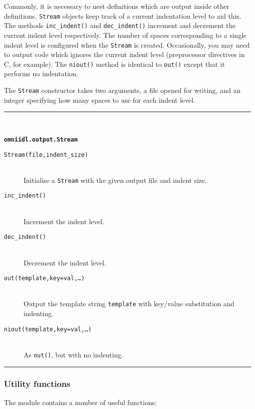 \documentclass[11pt,twoside,a4paper]{article}
\newcommand{\func}[1]{\texttt{#1}}
\newcommand{\var}[1]{\texttt{#1}}
\newcommand{\class}[1]{\texttt{#1}}
\newcommand{\dfunc}[1]{\item[\func{#1}]\mbox{}\\}
\newenvironment{funcdesc}[1]%
  {\vspace{\baselineskip}%
   \noindent\begin{minipage}{\textwidth}%
   \noindent\rule{\textwidth}{1.5pt}\\%
   \centerline{\textbf{\texttt{#1}}}%
   \vspace{-.5\baselineskip}%
   \begin{description}}
  {\vspace{-\baselineskip}\end{description}%
   \noindent\rule{\textwidth}{1.5pt}\end{minipage}}
\newcommand{\file}{\begingroup \urlstyle{tt}\Url}
\begin{document}
Commonly, it is necessary to nest definitions which are output inside
other definitions. \class{Stream} objects keep track of a current
indentation level to aid this. The methods \func{inc\_indent()} and
\func{dec\_indent()} increment and decrement the current indent level
respectively. The number of spaces corresponding to a single indent
level is configured when the \class{Stream} is created. Occasionally,
you may need to output code which ignores the current indent level
(preprocessor directives in C, for example). The \func{niout()} method
is identical to \func{out()} except that it performs no indentation.

The \class{Stream} constructor takes two arguments, a file opened for
writing, and an integer specifying how many spaces to use for each
indent level.


\begin{funcdesc}{omniidl.output.Stream}

\dfunc{Stream(file,indent\_size)}
  Initialise a \class{Stream} with the given output file and indent
  size.

\dfunc{inc\_indent()}
  Increment the indent level.

\dfunc{dec\_indent()}
  Decrement the indent level.

\dfunc{out(template,key=val,\dots)}
  Output the template string \var{template} with key/value
  substitution and indenting.

\dfunc{niout(template,key=val,\dots)}
  As \func{out()}, but with no indenting.

\end{funcdesc}


\subsubsection{Utility functions}

The \file{omniidl.idlutil} module contains a number of useful
functions:
\end{document}
